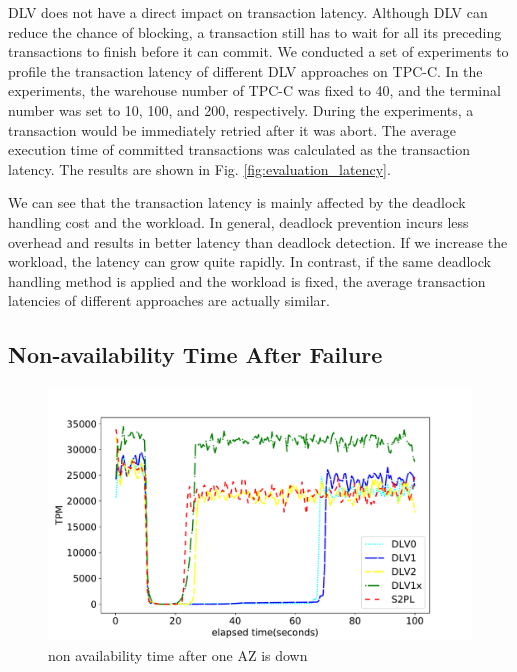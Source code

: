 \documentclass[conference]{IEEEtran}
\begin{document}
\begin{highlighted}
  DLV does not have a direct impact on transaction latency.
  Although DLV can reduce the chance of blocking, a transaction still has to wait for all its preceding transactions to finish before it can commit.
  We conducted a set of experiments to profile the transaction latency of different DLV approaches on TPC-C. 
  In the experiments, the warehouse number of TPC-C was fixed to 40, and the terminal number was set to 10, 100, and 200, respectively.
  During the experiments, a transaction would be immediately retried after it was abort.
  The average execution time of committed transactions was calculated as the transaction latency. The results are shown in Fig. \ref{fig:evaluation_latency}.
  
  We can see that the transaction latency is mainly affected by the deadlock handling cost and the workload.
  In general, deadlock prevention incurs less overhead and results in better latency than deadlock detection. If we increase the workload, the latency can grow quite rapidly.
  In contrast, if the same deadlock handling method is applied and the workload is fixed, the average transaction latencies of different approaches are actually similar. 

\end{highlighted}
\subsection{Non-availability Time After Failure}

\begin{figure}[tbp]
  \centering
  { \includegraphics[scale=0.28] {figure/plot_availability}
  \caption{non availability time after one AZ is down}
  \label{fig:plot_availability:tpm}}
\end{figure}
\end{document}
